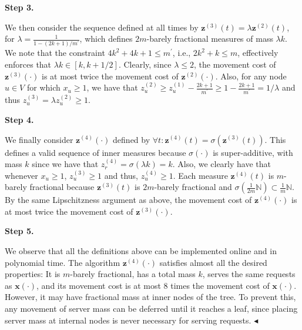\documentclass[10pt,a4paper]{article}
\begin{document}
\par\medskip\noindent\textbf{Step 3.}\par




We then consider the sequence defined at all times by ${\mathbf{z}}^{(3)}(t)=\lambda{\mathbf{z}}^{(2)}(t)$, for $\lambda=\frac{1}{1-(2k+1)/m^{\prime}}$, which defines $2m$-barely fractional measures of mass $\lambda k$. We note that the constraint $4k^{2}+4k+1\leq m^{\prime}$, i.e., $2k^{2}+k\leq m$, effectively enforces that $\lambda k\in[k,k+1/2]$. Clearly, since $\lambda\leq 2$, the movement cost of ${\mathbf{z}}^{(3)}(\cdot)$ is at most twice the movement cost of ${\mathbf{z}}^{(2)}(\cdot)$. Also, for any node $u\in V$ for which $x_{u}\geq 1$, we have that $z_{u}^{(2)}\geq z_{u}^{(1)}-\frac{2k+1}{m^{\prime}}\geq 1-\frac{2k+1}{m^{\prime}}=1/\lambda$ and thus $z_{u}^{(3)}=\lambda z_{u}^{(2)}\geq 1$.\par





\par\medskip\noindent\textbf{Step 4.}\par




We finally consider ${\mathbf{z}}^{(4)}(\cdot)$ defined by $\forall t\colon{\mathbf{z}}^{(4)}(t)=\sigma({\mathbf{z}}^{(3)}(t))$. This defines a valid sequence of inner measures because $\sigma(\cdot)$ is super-additive, with mass $k$ since we have that $z^{(4)}_{r}=\sigma\left(\lambda k\right)=k$. Also, we clearly have that whenever $x_{u}\geq 1$, $z^{(3)}_{u}\geq 1$ and thus, $z^{(4)}_{u}\geq 1$. Each measure ${\mathbf{z}}^{(4)}(t)$ is $m$-barely fractional because ${\mathbf{z}}^{(3)}(t)$ is $2m$-barely fractional and $\sigma\left(\frac{1}{2m}\mathbb{N}\right)\subset\frac{1}{m}\mathbb{N}$. By the same Lipschitzness argument as above, the movement cost of ${\mathbf{z}}^{(4)}(\cdot)$ is at most twice the movement cost of ${\mathbf{z}}^{(3)}(\cdot)$.\par





\par\medskip\noindent\textbf{Step 5.}\par




We observe that all the definitions above can be implemented online and in polynomial time. The algorithm ${\mathbf{z}}^{(4)}(\cdot)$ satisfies almost all the desired properties: It is $m$-barely fractional, has a total mass $k$, serves the same requests as ${\boldsymbol{x}}(\cdot)$, and its movement cost is at most $8$ times the movement cost of ${\boldsymbol{x}}(\cdot)$. However, it may have fractional mass at inner nodes of the tree. To prevent this, any movement of server mass can be deferred until it reaches a leaf, since placing server mass at internal nodes is never necessary for serving requests.
$\blacktriangleleft$\par
\end{document}
